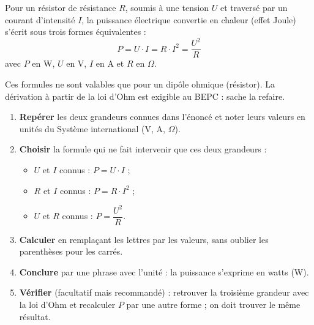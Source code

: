 \documentclass[11pt]{article}
\begin{document}
\begin{propriete}
Pour un résistor de résistance $R$, soumis à une tension $U$ et traversé par un courant d'intensité $I$, la puissance électrique convertie en chaleur (effet Joule) s'écrit sous trois formes équivalentes :
\[ P = U \cdot I = R \cdot I^2 = \frac{U^2}{R} \]
avec $P$ en W, $U$ en V, $I$ en A et $R$ en $\Omega$.\par
Ces formules ne sont valables que pour un dipôle ohmique (résistor). La dérivation à partir de la loi d'Ohm est exigible au BEPC : sache la refaire.
\end{propriete}

\begin{methode}
\begin{enumerate}
\item \textbf{Repérer} les deux grandeurs connues dans l'énoncé et noter leurs valeurs en unités du Système international (V, A, $\Omega$).
\item \textbf{Choisir} la formule qui ne fait intervenir que ces deux grandeurs :
\begin{itemize}
\item $U$ et $I$ connus : $P = U \cdot I$ ;
\item $R$ et $I$ connus : $P = R \cdot I^2$ ;
\item $U$ et $R$ connus : $P = \dfrac{U^2}{R}$.
\end{itemize}
\item \textbf{Calculer} en remplaçant les lettres par les valeurs, sans oublier les parenthèses pour les carrés.
\item \textbf{Conclure} par une phrase avec l'unité : la puissance s'exprime en watts (W).
\item \textbf{Vérifier} (facultatif mais recommandé) : retrouver la troisième grandeur avec la loi d'Ohm et recalculer $P$ par une autre forme ; on doit trouver le même résultat.
\end{enumerate}
\end{methode}
\end{document}
